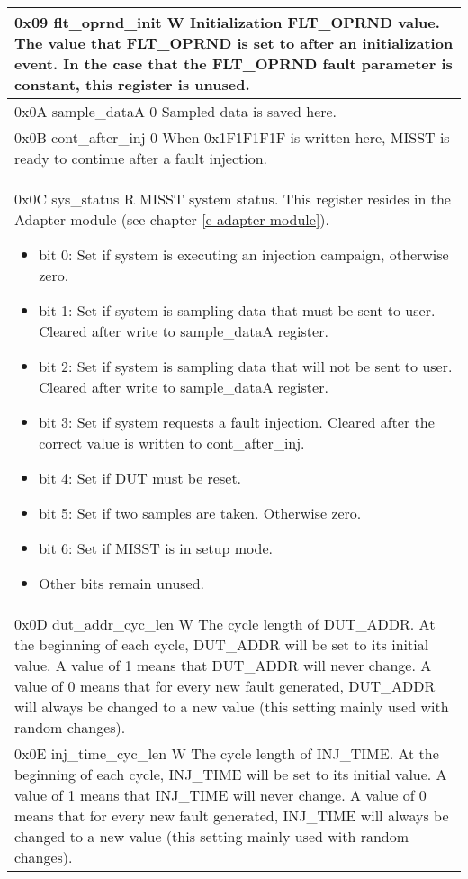 \documentclass[]{report}
\begin{document}
\begin{center}
\begin{longtable}{| p{\linewidth} |}
		\hline
		0x09  flt\_oprnd\_init  W \newline 
		Initialization FLT\_OPRND value. The value that FLT\_OPRND is set to after an initialization event. In the case that the FLT\_OPRND fault parameter is constant, this register is unused.\\
		\hline 
		0x0A  sample\_dataA  0 \newline 
		Sampled data is saved here. \\ 
		\hline 
		0x0B  cont\_after\_inj  0 \newline 
		When 0x1F1F1F1F is written here, MISST is ready to continue after a fault injection.\\ 
		\hline 
		0x0C  sys\_status  R \newline 
		MISST system status. This register resides in the Adapter module (see chapter \ref{c adapter module}).
		\begin{itemize}
			\item bit 0: Set if system is executing an injection campaign, otherwise zero.
			\item bit 1: Set if system is sampling data that must be sent to user. Cleared after write to sample\_dataA register.
			\item bit 2: Set if system is sampling data that will not be sent to user. Cleared after write to sample\_dataA register.
			\item bit 3: Set if system requests a fault injection. Cleared after the correct value is written to cont\_after\_inj.
			\item bit 4: Set if DUT must be reset.
			\item bit 5: Set if two samples are taken. Otherwise zero.
			\item bit 6: Set if MISST is in setup mode.
			\item Other bits remain unused.
		\end{itemize}\\ 
		\hline 
		0x0D dut\_addr\_cyc\_len W \newline
		The cycle length of DUT\_ADDR. At the beginning of each cycle, DUT\_ADDR will be set to its initial value. A value of 1 means that DUT\_ADDR will never change. A value of 0 means that for every new fault generated, DUT\_ADDR will always be changed to a new value (this setting mainly used with random changes).\\
		\hline 
		0x0E inj\_time\_cyc\_len W \newline
		The cycle length of INJ\_TIME. At the beginning of each cycle, INJ\_TIME will be set to its initial value. A value of 1 means that INJ\_TIME will never change. A value of 0 means that for every new fault generated, INJ\_TIME will always be changed to a new value (this setting mainly used with random changes).\\

\end{longtable}
\end{center}
\end{document}
